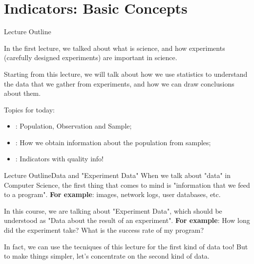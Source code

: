 
\section{Indicators: Basic Concepts}

\begin{frame}{Lecture Outline}

  In the first lecture, we talked about what is science, and how experiments
  (carefully designed experiments) are important in science.\bigskip

  Starting from this lecture, we will talk about how we use statistics to
  understand the data that we gather from experiments, and how we can draw
  conclusions about them.\bigskip

  Topics for today:
  \begin{itemize}
    \item {}: Population, Observation and Sample;
    \item {}: How we obtain information about the population from samples;
    \item {}: Indicators with quality info!
  \end{itemize}
\end{frame}

\begin{frame}{Lecture Outline}{Data and "Experiment Data"}
  When we talk about "data" in Computer Science, the first thing that comes to mind is "information that we feed to a program". {\bf For example}: images, network logs, user databases, etc.\bigskip

  In this course, we are talking about "Experiment Data", which should be understood as "Data about the result of an experiment". {\bf For example}: How long did the experiment take? What is the success rate of my program?\bigskip

  In fact, we can use the tecniques of this lecture for the first kind of data too! But to make things simpler, let's concentrate on the second kind of data.
\end{frame}

